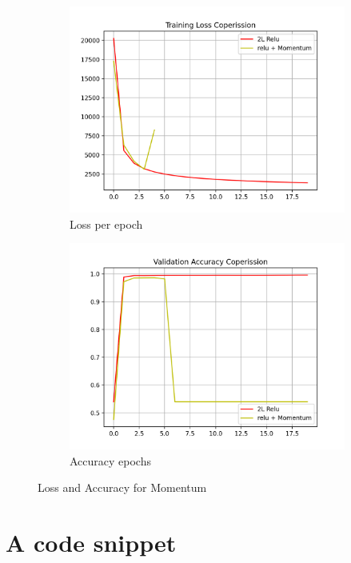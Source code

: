 \documentclass[a4 paper]{article}
\begin{document}
\begin{figure}[h!]
    \centering
    \begin{subfigure}{.5\textwidth}
      \centering
      \includegraphics[width=.9\linewidth]{images/q9_3.png}
      \caption{Loss per epoch}
      \label{fig:sub1}
    \end{subfigure}%
    \begin{subfigure}{.5\textwidth}
      \centering
      \includegraphics[width=.9\linewidth]{images/q9_4.png}
      \caption{Accuracy epochs}
      \label{fig:sub2}
    \end{subfigure}
    \caption{Loss and Accuracy for Momentum }
    \label{fig:test}
\end{figure}

\newpage
\section{A code snippet}
\end{document}
